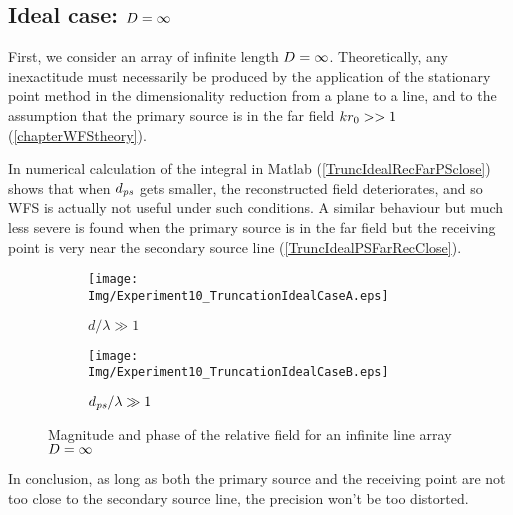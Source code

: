 \subsection{Ideal case: $D=\infty$}
First, we consider an array of infinite length $D=\infty$.
Theoretically, any inexactitude must necessarily be produced by the application of the stationary point method in the dimensionality reduction from a plane to a line, and to the assumption that the primary source is in the far field $kr_0 >> 1$ (\autoref{chapterWFStheory}).

In numerical calculation of the integral in Matlab (\autoref{TruncIdealRecFarPSclose}) shows that when $d_{\PosTheoSubInd[primarySource]}$ gets smaller, the reconstructed field deteriorates, and so WFS is actually not useful under such conditions. A similar behaviour but much less severe is found when the primary source is in the far field but the receiving point is very near the secondary source line (\autoref{TruncIdealPSFarRecClose}).
\begin{figure}[h]
	\centering
	\begin{subfigure}[b]{0.49\textwidth}
		\centering
		\texttt{[image: Img/Experiment10\_TruncationIdealCaseA.eps]}
		\caption{$d/\lambda \gg 1$}
		\label{TruncIdealRecFarPSclose}
	\end{subfigure}
	\begin{subfigure}[b]{0.49\textwidth}
		\centering
		\texttt{[image: Img/Experiment10\_TruncationIdealCaseB.eps]}
		\caption{$d_{\PosTheoSubInd[primarySource]}/\lambda \gg 1$}
		\label{TruncIdealPSFarRecClose}
	\end{subfigure}
	\caption{Magnitude and phase of the relative field for an infinite line array $D = \infty$}
\end{figure}
In conclusion, as long as both the primary source and the receiving point are not too close to the secondary source line, the precision won't be too distorted.


